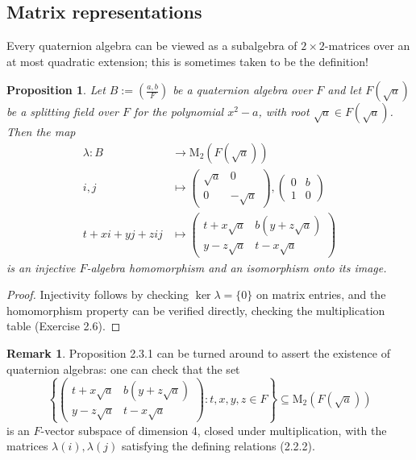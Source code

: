 \documentclass{article}
\newtheorem{proposition}[theorem]{Proposition}
\theoremstyle{definition}
\newtheorem{remark}[theorem]{Remark}
\begin{document}
\subsection{Matrix representations}

Every quaternion algebra can be viewed as a subalgebra of $2 \times 2$-matrices over an at most quadratic extension; this is sometimes taken to be the definition!

\begin{proposition}
Let $B := \left(\frac{a, b}{F}\right)$ be a quaternion algebra over $F$ and let $F(\sqrt{a})$ be a splitting field over $F$ for the polynomial $x^2 - a$, with root $\sqrt{a} \in F(\sqrt{a})$. Then the map
\begin{equation}
\begin{aligned}
\lambda \colon B &\to \mathrm{M}_2(F(\sqrt{a})) \\
i, j &\mapsto \begin{pmatrix} \sqrt{a} & 0 \\ 0 & -\sqrt{a} \end{pmatrix}, \begin{pmatrix} 0 & b \\ 1 & 0 \end{pmatrix} \\
t + xi + yj + zij &\mapsto \begin{pmatrix} t + x\sqrt{a} & b(y + z\sqrt{a}) \\ y - z\sqrt{a} & t - x\sqrt{a} \end{pmatrix}
\end{aligned} \tag{2.3.2}
\end{equation}
is an injective $F$-algebra homomorphism and an isomorphism onto its image.
\end{proposition}

\begin{proof}
Injectivity follows by checking $\ker \lambda = \{0\}$ on matrix entries, and the homomorphism property can be verified directly, checking the multiplication table (Exercise 2.6).
\end{proof}

\begin{remark}
Proposition 2.3.1 can be turned around to assert the existence of quaternion algebras: one can check that the set
$$\left\{ \begin{pmatrix} t + x\sqrt{a} & b(y + z\sqrt{a}) \\ y - z\sqrt{a} & t - x\sqrt{a} \end{pmatrix} : t, x, y, z \in F \right\} \subseteq \mathrm{M}_2(F(\sqrt{a}))$$
is an $F$-vector subspace of dimension 4, closed under multiplication, with the matrices $\lambda(i), \lambda(j)$ satisfying the defining relations (2.2.2).
\end{remark}
\end{document}
